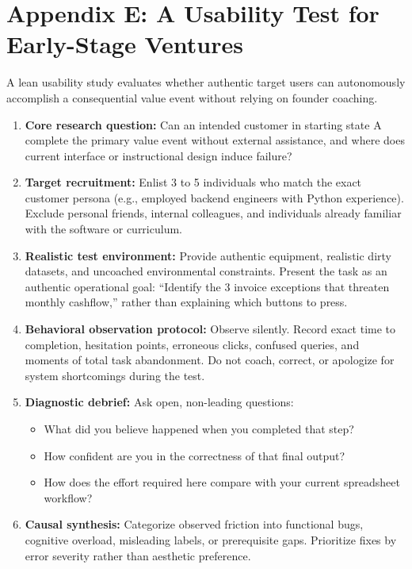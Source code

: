 
\section*{Appendix E: A Usability Test for Early-Stage Ventures}

A lean usability study evaluates whether authentic target users can autonomously accomplish a consequential value event without relying on founder coaching.

\begin{enumerate}[leftmargin=*]
\item \textbf{Core research question:} Can an intended customer in starting state A complete the primary value event without external assistance, and where does current interface or instructional design induce failure?
\item \textbf{Target recruitment:} Enlist 3 to 5 individuals who match the exact customer persona (e.g., employed backend engineers with Python experience). Exclude personal friends, internal colleagues, and individuals already familiar with the software or curriculum.
\item \textbf{Realistic test environment:} Provide authentic equipment, realistic dirty datasets, and uncoached environmental constraints. Present the task as an authentic operational goal: ``Identify the 3 invoice exceptions that threaten monthly cashflow,'' rather than explaining which buttons to press.
\item \textbf{Behavioral observation protocol:} Observe silently. Record exact time to completion, hesitation points, erroneous clicks, confused queries, and moments of total task abandonment. Do not coach, correct, or apologize for system shortcomings during the test.
\item \textbf{Diagnostic debrief:} Ask open, non-leading questions:
\begin{itemize}
\item What did you believe happened when you completed that step?
\item How confident are you in the correctness of that final output?
\item How does the effort required here compare with your current spreadsheet workflow?
\end{itemize}
\item \textbf{Causal synthesis:} Categorize observed friction into functional bugs, cognitive overload, misleading labels, or prerequisite gaps. Prioritize fixes by error severity rather than aesthetic preference.
\end{enumerate}


